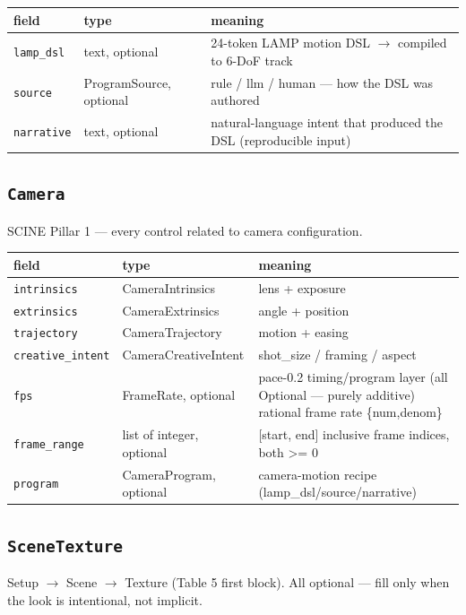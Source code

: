 \begin{longtable}{@{}R{0.24\textwidth}R{0.21\textwidth}R{0.49\textwidth}@{}}
\toprule \textbf{field} & \textbf{type} & \textbf{meaning} \\ \midrule
\endhead
\texttt{lamp\_\allowbreak dsl} & text, optional & 24-token LAMP motion DSL $\to$ compiled to 6-DoF track \\
\texttt{source} & ProgramSource, optional & rule /\allowbreak{} llm /\allowbreak{} human ---\allowbreak{} how the DSL was authored \\
\texttt{narrative} & text, optional & natural-language intent that produced the DSL (reproducible input) \\
\bottomrule
\end{longtable}

\subsection*{\texttt{Camera}}
\noindent SCINE Pillar 1 ---\allowbreak{} every control related to camera configuration.

\begin{longtable}{@{}R{0.24\textwidth}R{0.21\textwidth}R{0.49\textwidth}@{}}
\toprule \textbf{field} & \textbf{type} & \textbf{meaning} \\ \midrule
\endhead
\texttt{intrinsics} & CameraIntrinsics & lens + exposure \\
\texttt{extrinsics} & CameraExtrinsics & angle + position \\
\texttt{trajectory} & CameraTrajectory & motion + easing \\
\texttt{creative\_\allowbreak intent} & CameraCreativeIntent & shot\_\allowbreak size /\allowbreak{} framing /\allowbreak{} aspect \\
\texttt{fps} & FrameRate, optional & pace-0.2 timing/\allowbreak{}program layer (all Optional ---\allowbreak{} purely additive) rational frame rate \{num,denom\} \\
\texttt{frame\_\allowbreak range} & list of integer, optional & [start, end] inclusive frame indices, both >= 0 \\
\texttt{program} & CameraProgram, optional & camera-motion recipe (lamp\_\allowbreak dsl/\allowbreak{}source/\allowbreak{}narrative) \\
\bottomrule
\end{longtable}

\subsection*{\texttt{SceneTexture}}
\noindent Setup $\to$ Scene $\to$ Texture (Table 5 first block). All optional ---\allowbreak{} fill only when the look is intentional, not implicit.

